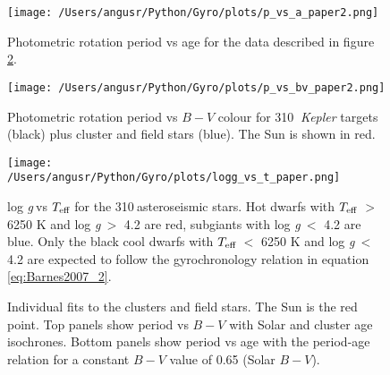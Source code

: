\documentclass[10pt,preprint]{aastex}
\newcommand{\logg}{log \emph{g}}
\newcommand{\teff}{$T_{\rm{eff}}$}
\newcommand{\nastero}{310}
\begin{document}



\begin{figure}[ht]
\begin{center}
\texttt{[image: /Users/angusr/Python/Gyro/plots/p\_vs\_a\_paper2.png]}
\caption{Photometric rotation period vs age for the data described in figure \ref{fig:3d}.}
\label{fig:p_vs_a}
\end{center}
\end{figure}

\begin{figure}[ht]
\begin{center}
\texttt{[image: /Users/angusr/Python/Gyro/plots/p\_vs\_bv\_paper2.png]}
\caption{Photometric rotation period vs $B-V$ colour for \nastero$~$ {\it Kepler} targets (black) plus cluster and field stars (blue). The Sun is shown in red.}
\label{fig:3d}
\end{center}
\end{figure}

\begin{figure}[ht]
\begin{center}
\texttt{[image: /Users/angusr/Python/Gyro/plots/logg\_vs\_t\_paper.png]}
\caption{\logg$~$vs \teff$~$for the \nastero$~$asteroseismic stars. Hot dwarfs with \teff$~>$ 6250 K and \logg$~>$ 4.2 are red, subgiants with \logg$~<$ 4.2 are blue. Only the black cool dwarfs with \teff$~<$ 6250 K and \logg$~<$ 4.2 are expected to follow the gyrochronology relation in equation \ref{eq:Barnes2007_2}.}
\label{fig:logg_vs_t}
\end{center}
\end{figure}

\begin{figure}[ht]
\begin{center}
    \end{center}
    \caption{ Individual fits to the clusters and field stars. The Sun is the red point. Top panels show period vs $B-V$ with Solar and cluster age isochrones. Bottom panels show period vs age with the period-age relation for a constant $B-V$ value of 0.65 (Solar $B-V$).}
   \label{fig:subfigures2}
\end{figure}
\end{document}
